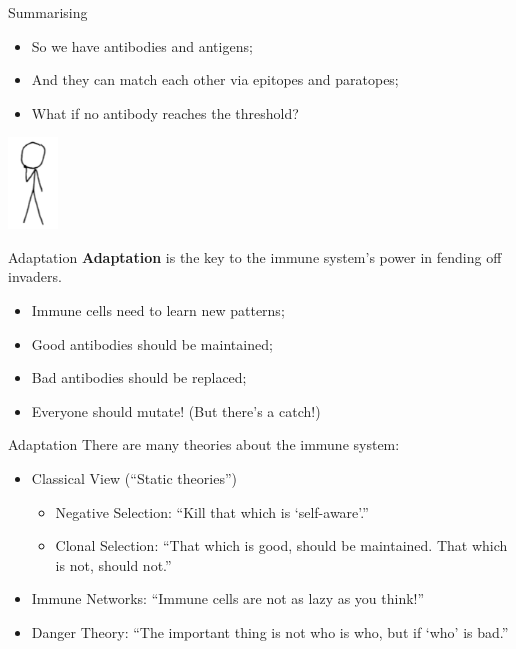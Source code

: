 \documentclass[xcolor=svgnames]{beamer}
\begin{document}
        \begin{frame}{Summarising}
            \begin{itemize}
                \item So we have antibodies and antigens;
                \item And they can match each other via epitopes and paratopes;
                \item What if no antibody reaches the threshold?
            \end{itemize}
            
            \vfill
            \hfill\includegraphics[width=50px]{fig/xkcd_doubt}
        \end{frame}
        
        \begin{frame}{Adaptation}
            \textbf{Adaptation} is the key to the immune system's power in fending off invaders.
        
            \begin{itemize}
                \item Immune cells need to learn new patterns;
                \item Good antibodies should be maintained;
                \item Bad antibodies should be replaced;
                \item Everyone should mutate! (But there's a catch!)
            \end{itemize}
        \end{frame}
        
        \begin{frame}{Adaptation}
            There are many theories about the immune system:
            
            \begin{itemize}
                \item Classical View (``Static theories'')
                \begin{itemize}
                    \item Negative Selection: ``Kill that which is `self-aware'.''
                    \item Clonal Selection: ``That which is good, should be maintained. That which is not, should not.''
                \end{itemize}
                \pause
                \item Immune Networks: ``Immune cells are not as lazy as you think!''
                \pause
                \item Danger Theory: ``The important thing is not who is who, but if `who' is bad.''
            \end{itemize}
        \end{frame}
            
\end{document}
